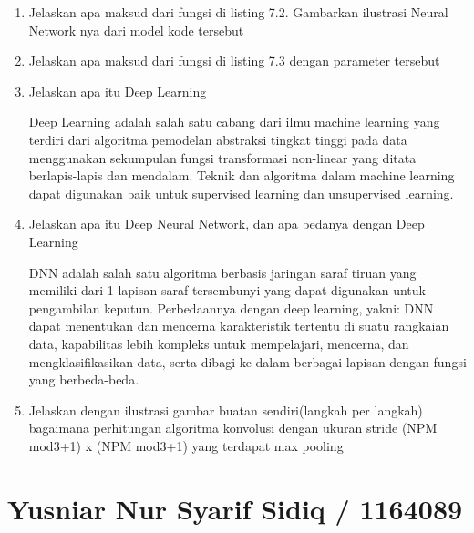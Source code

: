 \begin{enumerate}
\item Jelaskan apa maksud dari fungsi di listing 7.2. Gambarkan ilustrasi Neural Network nya dari model kode tersebut \par

\item Jelaskan apa maksud dari fungsi di listing 7.3 dengan parameter tersebut \par

\item Jelaskan apa itu Deep Learning \par
Deep Learning adalah salah satu cabang dari ilmu machine learning yang terdiri dari algoritma pemodelan abstraksi tingkat tinggi pada data menggunakan sekumpulan fungsi transformasi non-linear yang ditata berlapis-lapis dan mendalam. Teknik dan algoritma dalam machine learning dapat digunakan baik untuk supervised learning dan unsupervised learning.

\item Jelaskan apa itu Deep Neural Network, dan apa bedanya dengan Deep Learning \par
DNN adalah salah satu algoritma berbasis jaringan saraf tiruan yang memiliki dari 1 lapisan saraf tersembunyi yang dapat digunakan untuk pengambilan keputun. Perbedaannya dengan deep learning, yakni: DNN dapat menentukan dan mencerna karakteristik tertentu di suatu rangkaian data, kapabilitas lebih kompleks untuk mempelajari, mencerna, dan mengklasifikasikan data, serta dibagi ke dalam berbagai lapisan dengan fungsi yang berbeda-beda.

\item Jelaskan dengan ilustrasi gambar buatan sendiri(langkah per langkah) bagaimana perhitungan algoritma konvolusi dengan ukuran stride (NPM mod3+1) x (NPM mod3+1) yang terdapat max pooling \par

\end{enumerate}

\section{Yusniar Nur Syarif Sidiq / 1164089}

